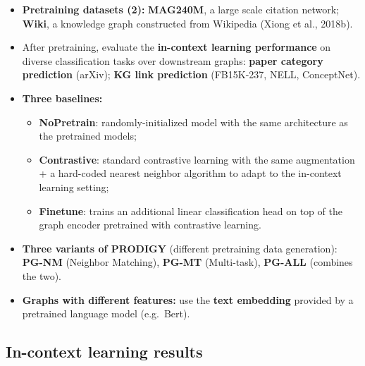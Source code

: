 \begin{itemize}
  \item \textbf{Pretraining datasets (2):} \textbf{MAG240M}, a large scale citation
    network; \textbf{Wiki}, a knowledge graph constructed from Wikipedia (Xiong et al.,
    2018b).
  \item After pretraining, evaluate the \textbf{in-context learning performance} on
    diverse classification tasks over downstream graphs: \textbf{paper category
    prediction} (arXiv); \textbf{KG link prediction} (FB15K-237, NELL, ConceptNet).
  \item \textbf{Three baselines:}
    \begin{itemize}
      \item \textbf{NoPretrain}: randomly-initialized model with the same architecture as
        the pretrained models;
      \item \textbf{Contrastive}: standard contrastive learning with the same augmentation
        + a hard-coded nearest neighbor algorithm to adapt to the in-context learning
        setting;
      \item \textbf{Finetune}: trains an additional linear classification head on top of
        the graph encoder pretrained with contrastive learning.
    \end{itemize}
  \item \textbf{Three variants of PRODIGY} (different pretraining data generation):
    \textbf{PG-NM} (Neighbor Matching), \textbf{PG-MT} (Multi-task), \textbf{PG-ALL}
    (combines the two).
  \item \textbf{Graphs with different features:} use the \textbf{text embedding} provided
    by a pretrained language model (e.g.\ Bert).
\end{itemize}

\subsection{In-context learning results}\label{sec:lec14-results}

